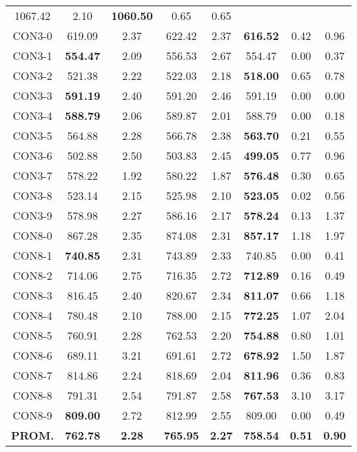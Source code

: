 \begin{table}[h]
\begin{tabular}{c c c c c c c c}
1067.42 & 2.10 & \bf{1060.50} & 
0.65 & 0.65\\CON3-0 & 619.09 & 2.37 & 
622.42 & 2.37 & \bf{616.52} & 
0.42 & 0.96\\CON3-1 & \bf{554.47} & 2.09 & 
556.53 & 2.67 & 554.47 & 0.00
 & 0.37\\CON3-2 & 521.38 & 2.22 & 
522.03 & 2.18 & \bf{518.00} & 
0.65 & 0.78\\CON3-3 & \bf{591.19} & 2.40 & 
591.20 & 2.46 & 591.19 & 0.00
 & 0.00\\CON3-4 & \bf{588.79} & 2.06 & 
589.87 & 2.01 & 588.79 & 0.00
 & 0.18\\CON3-5 & 564.88 & 2.28 & 
566.78 & 2.38 & \bf{563.70} & 
0.21 & 0.55\\CON3-6 & 502.88 & 2.50 & 
503.83 & 2.45 & \bf{499.05} & 
0.77 & 0.96\\CON3-7 & 578.22 & 1.92 & 
580.22 & 1.87 & \bf{576.48} & 
0.30 & 0.65\\CON3-8 & 523.14 & 2.15 & 
525.98 & 2.10 & \bf{523.05} & 
0.02 & 0.56\\CON3-9 & 578.98 & 2.27 & 
586.16 & 2.17 & \bf{578.24} & 
0.13 & 1.37\\CON8-0 & 867.28 & 2.35 & 
874.08 & 2.31 & \bf{857.17} & 
1.18 & 1.97\\CON8-1 & \bf{740.85} & 2.31 & 
743.89 & 2.33 & 740.85 & 0.00
 & 0.41\\CON8-2 & 714.06 & 2.75 & 
716.35 & 2.72 & \bf{712.89} & 
0.16 & 0.49\\CON8-3 & 816.45 & 2.40 & 
820.67 & 2.34 & \bf{811.07} & 
0.66 & 1.18\\CON8-4 & 780.48 & 2.10 & 
788.00 & 2.15 & \bf{772.25} & 
1.07 & 2.04\\CON8-5 & 760.91 & 2.28 & 
762.53 & 2.20 & \bf{754.88} & 
0.80 & 1.01\\CON8-6 & 689.11 & 3.21 & 
691.61 & 2.72 & \bf{678.92} & 
1.50 & 1.87\\CON8-7 & 814.86 & 2.24 & 
818.69 & 2.04 & \bf{811.96} & 
0.36 & 0.83\\CON8-8 & 791.31 & 2.54 & 
791.87 & 2.58 & \bf{767.53} & 
3.10 & 3.17\\CON8-9 & \bf{809.00} & 2.72 & 
812.99 & 2.55 & 809.00 & 0.00
 & 0.49\\\bf{PROM.} & 
\bf{762.78} & \bf{2.28} & \bf{765.95} & \bf{2.27} & \bf{758.54} & \bf{0.51} & \bf{0.90}\\[1ex]\hline
\end{tabular}
\label{table:nonlin}
\end{table}
